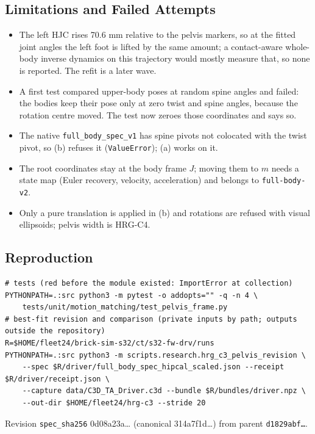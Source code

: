 \subsection{Limitations and Failed Attempts}
\begin{itemize}
  \item The left HJC rises 70.6 mm relative to the pelvis markers, so at the fitted
  joint angles the left foot is lifted by the same amount; a contact-aware whole-body
  inverse dynamics on this trajectory would mostly measure that, so none is reported.
  The refit is a later wave.
  \item A first test compared upper-body poses at random spine angles and failed:
  the bodies keep their pose only at zero twist and spine angles, because the rotation
  centre moved. The test now zeroes those coordinates and says so.
  \item The native \texttt{full\_body\_spec\_v1} has spine pivots not colocated with
  the twist pivot, so (b) refuses it (\texttt{ValueError}); (a) works on it.
  \item The root coordinates stay at the body frame $J$; moving them to $m$ needs a state
  map (Euler recovery, velocity, acceleration) and belongs to \texttt{full-body-v2}.
  \item Only a pure translation is applied in (b) and rotations are refused with visual
  ellipsoids; pelvis width is HRG-C4.
\end{itemize}

\subsection{Reproduction}
\begin{verbatim}
# tests (red before the module existed: ImportError at collection)
PYTHONPATH=.:src python3 -m pytest -o addopts="" -q -n 4 \
    tests/unit/motion_matching/test_pelvis_frame.py
# best-fit revision and comparison (private inputs by path; outputs outside the repository)
R=$HOME/fleet24/brick-sim-s32/ct/s32-fw-drv/runs
PYTHONPATH=.:src python3 -m scripts.research.hrg_c3_pelvis_revision \
    --spec $R/driver/full_body_spec_hipcal_scaled.json --receipt $R/driver/receipt.json \
    --capture data/C3D_TA_Driver.c3d --bundle $R/bundles/driver.npz \
    --out-dir $HOME/fleet24/hrg-c3 --stride 20
\end{verbatim}
Revision \texttt{spec\_sha256} 0d08a23a\ldots{} (canonical 314a7f1d\ldots{}) from parent
\texttt{d1829abf\ldots{}}.
